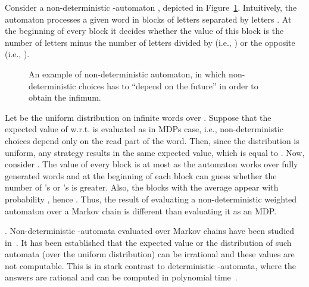 \documentclass{lmcs}
\begin{document}
\begin{exa}
Consider a non-deterministic -automaton , depicted in Figure~\ref{fig:nondet-vs-MDP}.
Intuitively, the automaton processes a given word in blocks of letters  separated by letters .
At the beginning of every block it decides whether the value of this block is
the number of  letters  minus the number of  letters  divided by 
(i.e., ) or
the opposite (i.e., ).
\begin{figure}
\centering
{}
\caption{An example of non-deterministic automaton, in which non-deterministic choices has to ``depend on the future'' in order to obtain the infimum.}\label{fig:nondet-vs-MDP}
\vspace{-1em}
\end{figure}
Let  be the uniform distribution on infinite words over .
Suppose that the expected value of  w.r.t.  is evaluated as in MDPs case, i.e.,
non-deterministic choices depend only on the read part of the word.
Then, since the distribution is uniform, any strategy results in the same expected value, which is equal to .
Now, consider . The value of every block is at most  as the automaton works over fully
generated words and at the beginning of each block can guess whether the number of 's or 's is greater.
Also, the blocks  with the average   appear with probability , hence
.
Thus, the result of evaluating a non-deterministic weighted automaton over a Markov chain is different than evaluating
it as an MDP\@.
\end{exa}

\smallskip{}.
Non-deterministic -automata evaluated over Markov chains have been studied in~\cite{concur18}.
It has been established that the expected value or the distribution of such automata (over the uniform distribution) can be irrational and these values are not computable.
This is in stark contrast to deterministic -automata, where the answers are rational and can be computed in polynomial time~\cite{BaierBook}.
\end{document}

